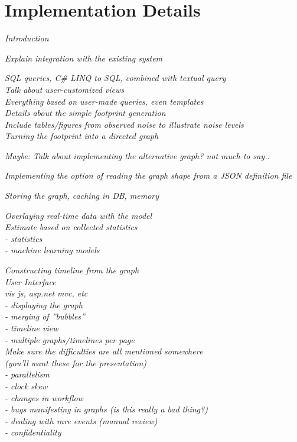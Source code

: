 \documentclass[english,12pt,a4paper,pdftex,sci,utf8]{aaltothesis}
\theoremstyle{definition}
\newcommand{\nyi}[1]{\noindent\colorbox{nyibg}{\textcolor{nyitext}{\emph{#1}}}}
\begin{document}

\clearpage
\section{Implementation Details}

\nyi{Introduction}

\nyi{Explain integration with the existing system}

\nyi{SQL queries, C\# LINQ to SQL, combined with textual query}\\
\nyi{Talk about user-customized views}\\
\nyi{Everything based on user-made queries, even templates}\\

\nyi{Details about the simple footprint generation}\\
\nyi{Include tables/figures from observed noise to illustrate noise levels}\\

\nyi{Turning the footprint into a directed graph}

\nyi{Maybe: Talk about implementing the alternative graph? not much to say..}

\nyi{Implementing the option of reading the graph shape from a JSON definition file}

\nyi{Storing the graph, caching in DB, memory}

\nyi{Overlaying real-time data with the model}\\

\nyi{Estimate based on collected statistics}\\
\nyi{ - statistics}\\
\nyi{ - machine learning models}

\nyi{Constructing timeline from the graph}\\

\nyi{User Interface}\\
\nyi{vis js, asp.net mvc, etc}\\
\nyi{ - displaying the graph}\\
\nyi{ - merging of ''bubbles''}\\
\nyi{ - timeline view}\\
\nyi{ - multiple graphs/timelines per page}\\

\nyi{Make sure the difficulties are all mentioned somewhere}\\
\nyi{(you'll want these for the presentation)}\\
\nyi{ - parallelism}\\
\nyi{ - clock skew}\\
\nyi{ - changes in workflow}\\
\nyi{ - bugs manifesting in graphs (is this really a bad thing?)}\\
\nyi{ - dealing with rare events (manual review)}\\
\nyi{ - confidentiality}\\
\end{document}
